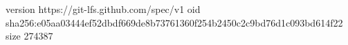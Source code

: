 version https://git-lfs.github.com/spec/v1
oid sha256:e05aa03444ef52dbdf669de8b73761360f254b2450c2c9bd76d1c093bd614f22
size 274387
